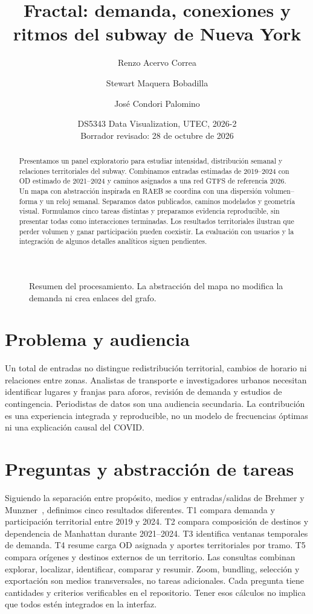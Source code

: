 \documentclass[10pt,twocolumn]{article}
\title{Fractal: demanda, conexiones y ritmos del subway de Nueva York}
\author{Renzo Acervo Correa \and Stewart Maquera Bobadilla \and José Condori Palomino}
\date{DS5343 Data Visualization, UTEC, 2026-2\\Borrador revisado: 28 de octubre de 2026}
\begin{document}
\maketitle
\begin{abstract}
Presentamos un panel exploratorio para estudiar intensidad, distribución semanal y relaciones territoriales del subway. Combinamos entradas estimadas de 2019--2024 con OD estimado de 2021--2024 y caminos asignados a una red GTFS de referencia 2026. Un mapa con abstracción inspirada en RAEB se coordina con una dispersión volumen--forma y un reloj semanal. Separamos datos publicados, caminos modelados y geometría visual. Formulamos cinco tareas distintas y preparamos evidencia reproducible, sin presentar todas como interacciones terminadas. Los resultados territoriales ilustran que perder volumen y ganar participación pueden coexistir. La evaluación con usuarios y la integración de algunos detalles analíticos siguen pendientes.
\end{abstract}
\begin{figure}[h]\centering\small
{}
\caption{Resumen del procesamiento. La abstracción del mapa no modifica la demanda ni crea enlaces del grafo.}
\end{figure}
\section{Problema y audiencia}
Un total de entradas no distingue redistribución territorial, cambios de horario ni relaciones entre zonas. Analistas de transporte e investigadores urbanos necesitan identificar lugares y franjas para aforos, revisión de demanda y estudios de contingencia. Periodistas de datos son una audiencia secundaria. La contribución es una experiencia integrada y reproducible, no un modelo de frecuencias óptimas ni una explicación causal del COVID.
\section{Preguntas y abstracción de tareas}
Siguiendo la separación entre propósito, medios y entradas/salidas de Brehmer y Munzner~\cite{tasks}, definimos cinco resultados diferentes. T1 compara demanda y participación territorial entre 2019 y 2024. T2 compara composición de destinos y dependencia de Manhattan durante 2021--2024. T3 identifica ventanas temporales de demanda. T4 resume carga OD asignada y aportes territoriales por tramo. T5 compara orígenes y destinos externos de un territorio.
Las consultas combinan explorar, localizar, identificar, comparar y resumir. Zoom, bundling, selección y exportación son medios transversales, no tareas adicionales. Cada pregunta tiene cantidades y criterios verificables en el repositorio. Tener esos cálculos no implica que todos estén integrados en la interfaz.
\end{document}
